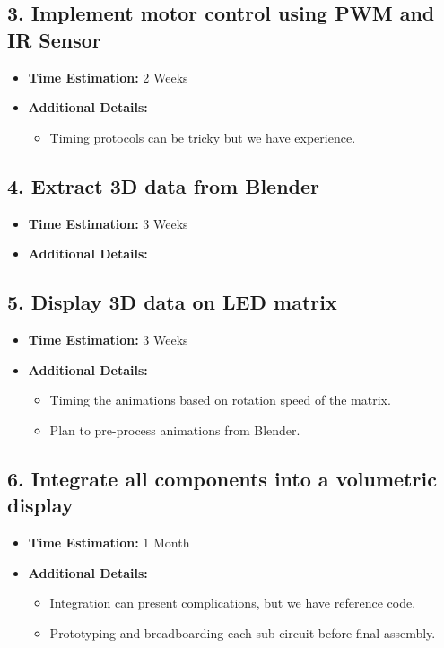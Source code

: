 \documentclass[11pt,journal]{IEEEtran}
\begin{document}
\subsection*{3. Implement motor control using PWM and IR Sensor}
\begin{itemize}
  \item \textbf{Time Estimation:} 2 Weeks
  \item \textbf{Additional Details:} 
  \begin{itemize}
    \item Timing protocols can be tricky but we have experience.
  \end{itemize}
\end{itemize}

\subsection*{4. Extract 3D data from Blender}
\begin{itemize}
  \item \textbf{Time Estimation:} 3 Weeks
  \item \textbf{Additional Details:} 

\end{itemize}

\subsection*{5. Display 3D data on LED matrix}
\begin{itemize}
  \item \textbf{Time Estimation:} 3 Weeks
  \item \textbf{Additional Details:} 
  \begin{itemize}
    \item Timing the animations based on rotation speed of the matrix.
    \item Plan to pre-process animations from Blender.
  \end{itemize}
\end{itemize}

\subsection*{6. Integrate all components into a volumetric display}
\begin{itemize}
  \item \textbf{Time Estimation:} 1 Month
  \item \textbf{Additional Details:} 
  \begin{itemize}
    \item Integration can present complications, but we have reference code.
    \item Prototyping and breadboarding each sub-circuit before final assembly.
  \end{itemize}
\end{itemize}
\end{document}
